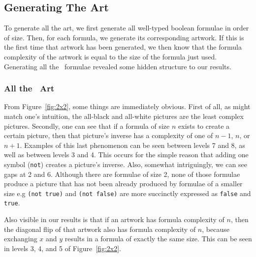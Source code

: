 \subsection{Generating The Art}

To generate all the art, we first generate all well-typed boolean formulae in
order of size.  Then, for each formula, we generate its corresponding artwork.
If this is the first time that artwork has been generated, we then know that
the formula complexity of the artwork is equal to the size of the formula just
used.  Generating all the \twoxtwo\ formulae revealed some hidden structure to
our results.

\subsubsection{All the \twoxtwo\ Art}

From Figure~\ref{fig:2x2}, some things are immediately obvious.  First of all,
as might match one's intuition, the all-black and all-white pictures are the
least complex pictures.  Secondly, one can see that if a formula of size $n$
exists to create a certain picture, then that picture's inverse has a
complexity of one of $n-1$, $n$, or $n+1$.  Examples of this last phenomenon
can be seen between levels 7 and 8, as well as between levels 3 and 4.  This
occurs for the simple reason that adding one symbol ({\tt not}) creates a
picture's inverse.  Also, somewhat intriguingly, we can see gaps at 2 and 6.
Although there are formulae of size 2, none of those formulae produce a picture
that has not been already produced by formulae of a smaller size e.g {\tt (not
true)} and {\tt (not false)} are more succinctly expressed as {\tt false} and
{\tt true}.

Also visible in our results is that if an artwork has formula complexity of
$n$, then the diagonal flip of that artwork also has formula complexity of $n$,
because exchanging $x$ and $y$ results in a formula of exactly the same size.
This can be seen in levels 3, 4, and 5 of Figure~\ref{fig:2x2}.

